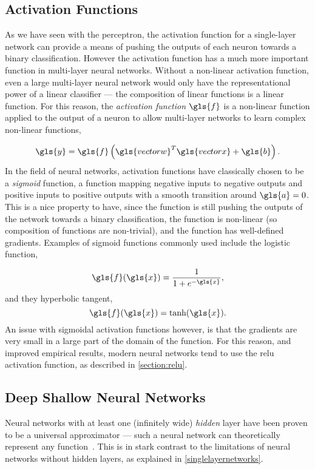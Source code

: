 \documentclass[thesis]{subfiles}
\begin{document}
\subsection{Activation Functions}\label{activationfunctions}
As we have seen with the perceptron, the activation function for a single-layer network can provide a means of pushing the outputs of each neuron towards a binary classification. However the activation function has a much more important function in multi-layer neural networks. Without a non-linear activation function, even a large multi-layer neural network would only have the representational power of a linear classifier --- the composition of linear functions is a linear function. For this reason, the \emph{activation function} $\gls{f}$ is a non-linear function applied to the output of a neuron to allow multi-layer networks to learn complex non-linear functions,

\begin{equation}
\gls{y} = \gls{f}\left(\gls{vectorw}^T\gls{vectorx} + \gls{b}\right).
\end{equation}
%
In the field of neural networks, activation functions have classically chosen to be a \emph{sigmoid} function, \ie a function mapping negative inputs to negative outputs and positive inputs to positive outputs with a smooth transition around $\gls{a} = 0$. This is a nice property to have, since the function is still pushing the outputs of the network towards a binary classification, the function is non-linear (so composition of functions are non-trivial), and the function has well-defined gradients. Examples of sigmoid functions commonly used include the logistic function, 

\begin{equation}
	\gls{f}(\gls{x}) = \frac{1}{1+e^{-\gls{x}}},
\end{equation}
%
and they hyperbolic tangent,
\begin{equation}
	\gls{f}(\gls{x}) = \tanh(\gls{x}).
\end{equation}
%
An issue with sigmoidal activation functions however, is that the gradients are very small in a large part of the domain of the function. For this reason, and improved empirical results, modern neural networks tend to use the \gls{relu} activation function, as described in \cref{section:relu}.


\subsection{Deep \Vs Shallow Neural Networks}
Neural networks with at least one (infinitely wide) \emph{hidden} layer have been proven to be a universal approximator --- \ie such a neural network can theoretically represent any function~\citep{journals/mcss/Cybenko92,hornik89a}. This is in stark contrast to the limitations of neural networks without hidden layers, as explained in \cref{singlelayernetworks}.
\end{document}
